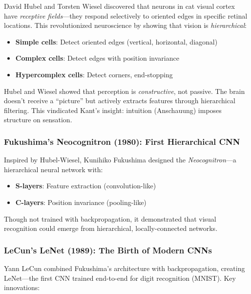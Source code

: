 David Hubel and Torsten Wiesel discovered that neurons in cat visual cortex have \textit{receptive fields}---they respond selectively to oriented edges in specific retinal locations. This revolutionized neuroscience by showing that vision is \textit{hierarchical}:

\begin{itemize}
	\item \textbf{Simple cells}: Detect oriented edges (vertical, horizontal, diagonal)
	\item \textbf{Complex cells}: Detect edges with position invariance
	\item \textbf{Hypercomplex cells}: Detect corners, end-stopping
\end{itemize}

\begin{remark}
	Hubel and Wiesel showed that perception is \textit{constructive}, not passive. The brain doesn't receive a ``picture'' but actively extracts features through hierarchical filtering. This vindicated Kant's insight: intuition (Anschauung) imposes structure on sensation.
\end{remark}

\subsubsection{Fukushima's Neocognitron (1980): First Hierarchical CNN}

Inspired by Hubel-Wiesel, Kunihiko Fukushima designed the \textit{Neocognitron}---a hierarchical neural network with:
\begin{itemize}
	\item \textbf{S-layers}: Feature extraction (convolution-like)
	\item \textbf{C-layers}: Position invariance (pooling-like)
\end{itemize}

Though not trained with backpropagation, it demonstrated that visual recognition could emerge from hierarchical, locally-connected networks.

\subsubsection{LeCun's LeNet (1989): The Birth of Modern CNNs}

Yann LeCun combined Fukushima's architecture with backpropagation, creating LeNet---the first CNN trained end-to-end for digit recognition (MNIST). Key innovations:

